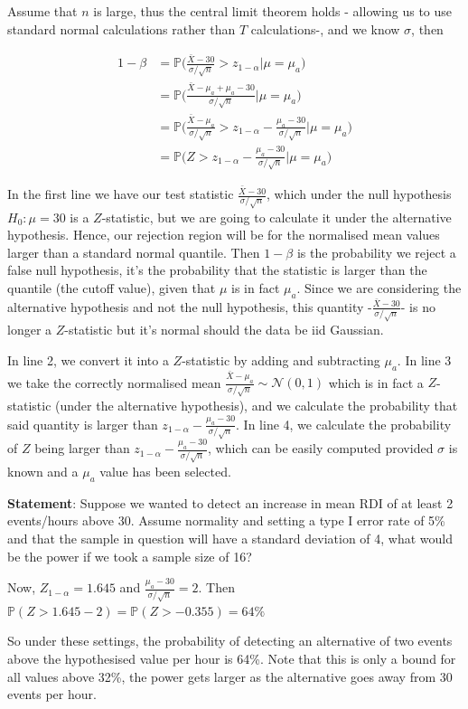 \documentclass{homework}
\begin{document}
Assume that $n$ is large, thus the central limit theorem holds - allowing us to use standard normal calculations rather than $T$ calculations-, and we know $\sigma$, then

\begin{align*}
        1- \beta &= \mathds{P}\bigg(\frac{\bar{X}-30}{\sigma/\sqrt{n}} > z_{1-\alpha}\bigg|\mu = \mu_a\bigg) \\
    &= \mathds{P}\bigg(\frac{\bar{X}-\mu_a+\mu_a-30}{\sigma/\sqrt{n}}\bigg| \mu = \mu_a\bigg) \\
    &= \mathds{P}\bigg(\frac{\bar{X}-\mu_a}{\sigma/\sqrt{n}}> z_{1-\alpha}-\frac{\mu_a-30}{\sigma/\sqrt{n}}\bigg|\mu = \mu_a\bigg) \\
    &= \mathds{P}\bigg(Z > z_{1-\alpha} -\frac{\mu_a-30}{\sigma/\sqrt{n}} \bigg|\mu = \mu_a\bigg)
\end{align*}

In the first line we have our test statistic $\frac{\bar{X}-30}{\sigma/\sqrt{n}}$, which under the null hypothesis $H_0 : \mu = 30$ is a $Z$-statistic, but we are going to calculate it under the alternative hypothesis. Hence, our rejection region will be for the normalised mean values larger than a standard normal quantile. Then $1-\beta$ is the probability we reject a false null hypothesis, it's the probability that the statistic is larger than the quantile (the cutoff value), given that $\mu$ is in fact $\mu_a$. 
Since we are considering the alternative hypothesis and not the null hypothesis, this quantity -$\frac{\bar{X}-30}{\sigma/\sqrt{n}}$- is no longer a $Z$-statistic but it's normal should the data be iid Gaussian. 

In line 2, we convert it into a $Z$-statistic by adding and subtracting $\mu_a$. In line 3 we take the correctly normalised mean $\frac{\bar{X}-\mu_a}{\sigma/\sqrt{n}} \sim \mathcal{N}(0, 1)$ which is in fact a $Z$-statistic (under the alternative hypothesis), and we calculate the probability that said quantity is larger than $z_{1-\alpha}-\frac{\mu_a-30}{\sigma/\sqrt{n}}$. 
In line 4, we calculate the probability of $Z$ being larger than $z_{1-\alpha}-\frac{\mu_a-30}{\sigma/\sqrt{n}}$, which can be easily computed provided $\sigma$ is known and a $\mu_a$ value has been selected. \\

\begin{tcolorbox}[title=Example]

\textbf{Statement}: Suppose we wanted to detect an increase in mean RDI of at least 2 events/hours above 30. Assume normality and setting a type I error rate of 5\% and that the sample in question will have a standard deviation of 4, what would be the power if we took a sample size of 16?

Now, $Z_{1-\alpha} = 1.645$ and $\frac{\mu_a-30}{\sigma/\sqrt{n}} = 2$. Then $\mathds{P}(Z > 1.645 - 2)  = \mathds{P}(Z > -0.355) = 64\%$

So under these settings, the probability of detecting an alternative of two events above the hypothesised value per hour is 64\%. Note that this is only a bound for all values above 32\%, the power gets larger as the alternative goes away from 30 events per hour.

\end{tcolorbox}
\end{document}
